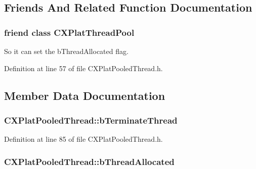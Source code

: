 \subsection{\-Friends \-And \-Related \-Function \-Documentation}
\hypertarget{class_c_x_plat_pooled_thread_ae6436844a6ddb7bc05268210cc9cdf3b}{
\subsubsection[{\-C\-X\-Plat\-Thread\-Pool}]{\setlength{\rightskip}{0pt plus 5cm}friend class {\bf \-C\-X\-Plat\-Thread\-Pool}}}\label{class_c_x_plat_pooled_thread_ae6436844a6ddb7bc05268210cc9cdf3b}


\-So it can set the b\-Thread\-Allocated flag. 



\-Definition at line 57 of file \-C\-X\-Plat\-Pooled\-Thread.\-h.



\subsection{\-Member \-Data \-Documentation}
\hypertarget{class_c_x_plat_pooled_thread_ab708ae971b8acdc4830987ea93ee4e52}{
\subsubsection[{b\-Terminate\-Thread}]{ {\bf \-C\-X\-Plat\-Pooled\-Thread\-::b\-Terminate\-Thread}}}\label{class_c_x_plat_pooled_thread_ab708ae971b8acdc4830987ea93ee4e52}


\-Definition at line 85 of file \-C\-X\-Plat\-Pooled\-Thread.\-h.

\hypertarget{class_c_x_plat_pooled_thread_af269720f4a5cd4e294d9b5fa7aebd50a}{
\subsubsection[{b\-Thread\-Allocated}]{ {\bf \-C\-X\-Plat\-Pooled\-Thread\-::b\-Thread\-Allocated}}}\label{class_c_x_plat_pooled_thread_af269720f4a5cd4e294d9b5fa7aebd50a}


